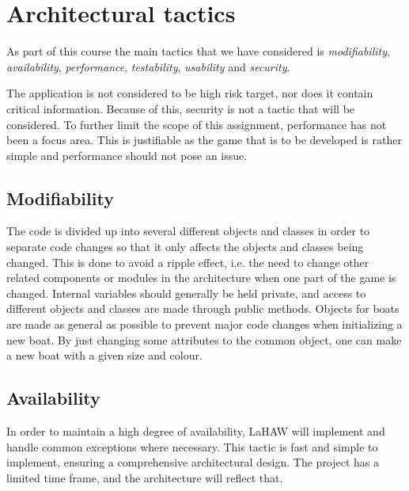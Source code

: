 \chapter{Architectural tactics}
As part of this course the main tactics that we have considered is \emph{modifiability}, \emph{availability}, \emph{performance}, \emph{testability}, \emph{usability} and \emph{security}.

The application is not considered to be high risk target, nor does it contain critical information. Because of this, security is not a tactic that will be considered. To further limit the scope of this assignment, performance has not been a focus area. This is justifiable as the game that is to be developed is rather simple and performance should not pose an issue.

    \section{Modifiability}
    The code is divided up into several different objects and classes in order to separate code changes so that it only affects the objects and classes being changed. This is done to avoid a ripple effect, i.e. the need to change other related components or modules in the architecture when one part of the game is changed\cite[p.~107]{pensum}. Internal variables should generally be held private, and access to different objects and classes are made through public methods. Objects for boats are made as general as possible to prevent major code changes when initializing a new boat. By just changing some attributes to the common object, one can make a new boat with a given size and colour. 
    
    \section{Availability}
    \label{avail}
    In order to maintain a high degree of availability, LaHAW will implement and handle common exceptions where necessary. This tactic is fast and simple to implement, ensuring a comprehensive architectural design. The project has a limited time frame, and the architecture will reflect that.
    
    
